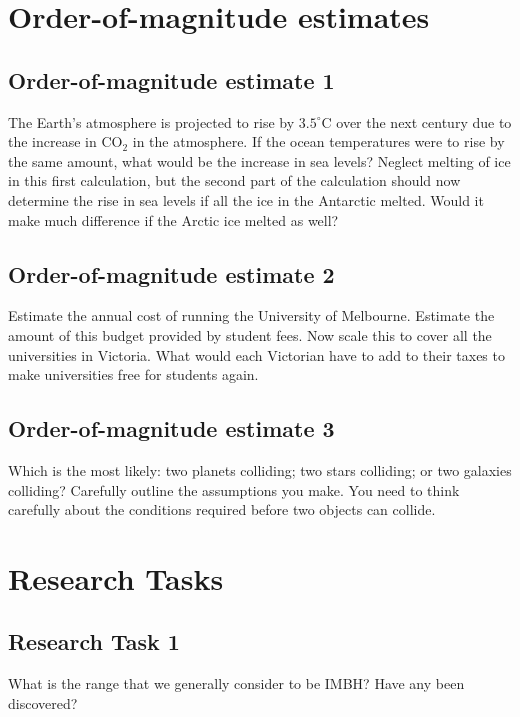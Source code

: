\documentclass[a4paper]{article} %
\begin{document}
\section{Order-of-magnitude estimates}
\subsection{Order-of-magnitude estimate 1}
\begin{framed}
The Earth's atmosphere is projected to rise by $3.5^{\circ}\text{C}$ over the next century due to the increase in CO$_2$ in the atmosphere. If the ocean temperatures were to rise by the same amount, what would be the increase in sea levels? Neglect melting of ice in this first calculation, but the second part of the calculation should now determine the rise in sea levels if all the ice in the Antarctic melted. Would it make much difference if the Arctic ice melted as well?
\end{framed}


\subsection{Order-of-magnitude estimate 2}
\begin{framed}
Estimate the annual cost of running the University of Melbourne.
Estimate the amount of this budget provided by student fees.
Now scale this to cover all the universities in Victoria.
What would each Victorian have to add to their taxes to make universities free for students again.
\end{framed}


\subsection{Order-of-magnitude estimate 3}
\begin{framed}
Which is the most likely: two planets colliding; two stars colliding; or two galaxies colliding? Carefully outline the assumptions you make. You need to think carefully about the conditions required before two objects can collide.
\end{framed}

\section{Research Tasks}
\subsection{Research Task 1}
\begin{framed}
What is the range that we generally consider to be IMBH? Have any been discovered?
\end{framed}
\end{document}

